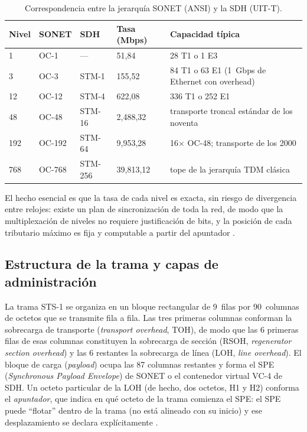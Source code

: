 \documentclass[12pt,a4paper]{article}
\begin{document}
\begin{table}[h]
    \centering
    \small
    \begin{tabularx}{\textwidth}{l l l l X}
        \toprule
        \textbf{Nivel} & \textbf{SONET} & \textbf{SDH} & \textbf{Tasa (Mbps)} & \textbf{Capacidad típica} \\
        \midrule
        1   & OC-1    & ---     & 51{,}84        & 28 T1 o 1 E3 \\
        3   & OC-3    & STM-1   & 155{,}52       & 84 T1 o 63 E1 (1~Gbps de Ethernet con overhead) \\
        12  & OC-12   & STM-4   & 622{,}08       & 336 T1 o 252 E1 \\
        48  & OC-48   & STM-16  & 2{,}488{,}32   & transporte troncal estándar de los noventa \\
        192 & OC-192  & STM-64  & 9{,}953{,}28    & 16× OC-48; transporte de los 2000 \\
        768 & OC-768  & STM-256 & 39{,}813{,}12   & tope de la jerarquía TDM clásica \\
        \bottomrule
    \end{tabularx}
    \caption{Correspondencia entre la jerarquía SONET (ANSI) y la SDH (UIT-T).}
    \label{tab:jerarquia}
\end{table}

El hecho esencial es que la tasa de cada nivel es exacta, sin riesgo de divergencia entre relojes: existe un plan de sincronización de toda la red, de modo que la multiplexación de niveles no requiere justificación de bits, y la posición de cada tributario máximo es fija y computable a partir del apuntador \cite{itug707}.

\subsection{Estructura de la trama y capas de administración}

La trama STS-1 se organiza en un bloque rectangular de 9~filas por 90~columnas de octetos que se transmite fila a fila. Las tres primeras columnas conforman la sobrecarga de transporte (\emph{transport overhead}, TOH), de modo que las 6 primeras filas de esas columnas constituyen la sobrecarga de sección (RSOH, \emph{regenerator section overhead}) y las 6 restantes la sobrecarga de línea (LOH, \emph{line overhead}). El bloque de carga (\emph{payload}) ocupa las 87 columnas restantes y forma el SPE (\emph{Synchronous Payload Envelope}) de SONET o el contenedor virtual VC-4 de SDH. Un octeto particular de la LOH (de hecho, dos octetos, H1 y H2) conforma el \emph{apuntador}, que indica en qué octeto de la trama comienza el SPE: el SPE puede ``flotar'' dentro de la trama (no está alineado con su inicio) y ese desplazamiento se declara explícitamente \cite{itug707, stallings2004}.
\end{document}
